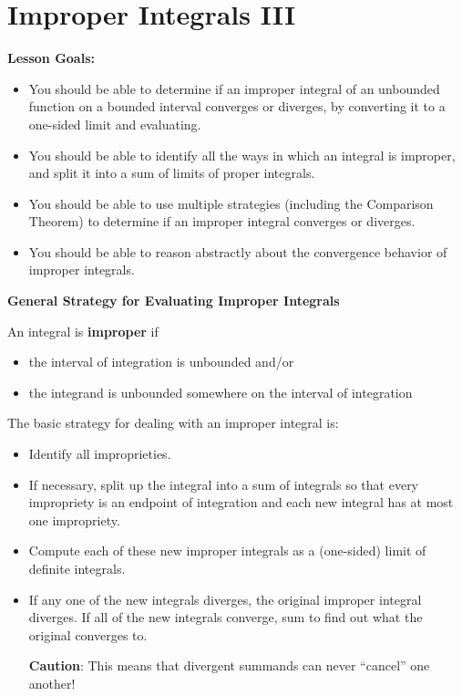 \documentclass[main]{subfiles}
\begin{document}
\ifSubfilesClassLoaded{%
  \chaptermark{\chapterone}
}{}

\section{Improper Integrals III} \label{ws1-11}
\begin{framed}
\textbf{Lesson Goals:}
\begin{itemize}
\item You should be able to determine if an improper integral of an unbounded function on a bounded interval converges or diverges, by converting it to a one-sided limit and evaluating. 
\item You should be able to identify all the ways in which an integral is improper, and split it into a sum of limits of proper integrals.
\item You should be able to use multiple strategies (including the Comparison Theorem) to determine if an improper integral converges or diverges. 
\item You should be able to reason abstractly about the convergence behavior of improper integrals.
\end{itemize}
\end{framed}


 
\begin{problemonly}
\begin{framed}
\centerline{\textbf{General Strategy for Evaluating Improper Integrals}}
An integral is \textbf{improper} if
\begin{itemize}
\item the interval of integration is unbounded and/or 
\item the integrand is unbounded somewhere on the interval of integration
\end{itemize}

The basic strategy for dealing with an improper integral is:
\begin{itemize}[topsep=0pt,parsep=0pt,itemsep=0pt]
\item Identify all improprieties.
\item If necessary, split up the integral into a sum of integrals so
that every impropriety is an endpoint of integration and each new
integral has at most one impropriety.
\item Compute each of these new improper integrals as a (one-sided)
limit of definite integrals.
\item If any one of the new integrals diverges, the original improper
integral diverges. If all of the new integrals converge, sum to find
out what the original converges to.

\vspace{8pt}  \textbf{ Caution}: This means that
divergent summands can never ``cancel'' one another!
\end{itemize}
\end{framed}
\end{problemonly}
\end{document}
